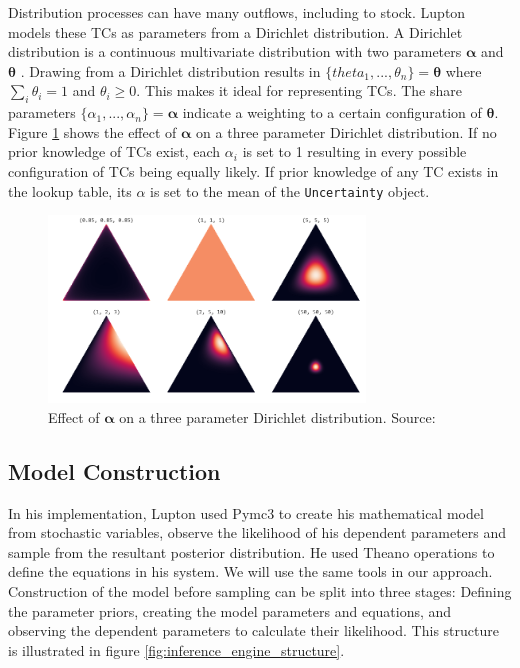 \documentclass[ %
                    author={Tom Jager},
                supervisor={Dr. Daniel Schien},
                    degree={MEng},
                     title={A Bayesian Inference Engine for UMIS Structured Data},
                  subtitle={},
                      type={research},
                      year={2019} ]{dissertation}
\begin{document}
Distribution processes can have many outflows, including to stock. Lupton models these TCs as parameters from a Dirichlet distribution. A Dirichlet distribution is a continuous multivariate distribution with two parameters $\bm{\alpha}$ and $\bm{\theta}$ \cite{dirichlet}. Drawing from a Dirichlet distribution results in $\{theta_1, ..., \theta_n\} = \bm{\theta}$ where $\sum_{i}\theta_i = 1$ and $\theta_i \ge 0$. This makes it ideal for representing TCs. The share parameters $\{\alpha_1, ..., \alpha_n\} = \bm{\alpha}$ indicate a weighting to a certain configuration of $\bm{\theta}$. Figure \ref{fig:dirichlet} shows the effect of $\bm{\alpha}$ on a three parameter Dirichlet distribution. If no prior knowledge of TCs exist, each $\alpha_i$ is set to 1 resulting in every possible configuration of TCs being equally likely. If prior knowledge of any TC exists in the lookup table, its $\alpha$ is set to the mean of the \texttt{Uncertainty} object.

\begin{figure}
    \centering
    \includegraphics[width=0.75\textwidth]{images/dirichlet.png}
    \caption{Effect of $\bm{\alpha}$ on a three parameter Dirichlet distribution. Source: \cite{dirichlet}}
    \label{fig:dirichlet}
\end{figure}

\subsection{Model Construction}
In his implementation, Lupton used Pymc3 to create his mathematical model from stochastic variables, observe the likelihood of his dependent parameters and sample from the resultant posterior distribution. He used Theano operations to define the equations in his system. We will use the same tools in our approach. Construction of the model before sampling can be split into three stages: Defining the parameter priors, creating the model parameters and equations, and observing the dependent parameters to calculate their likelihood. This structure is illustrated in figure \ref{fig:inference_engine_structure}.
\end{document}
